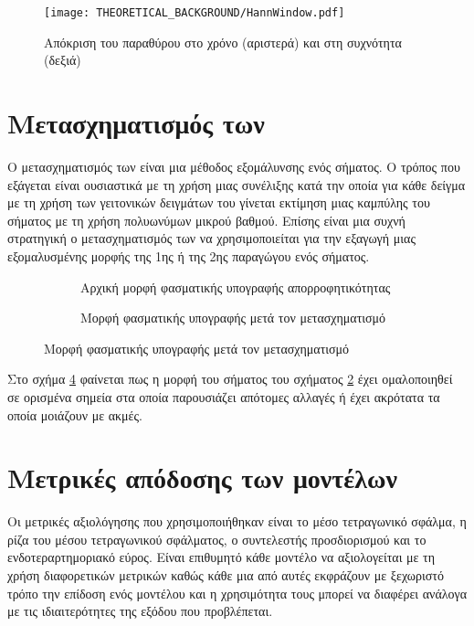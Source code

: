 \begin{figure}[H]
  \begin{center}%
    \texttt{[image: THEORETICAL\_BACKGROUND/HannWindow.pdf]}
    \caption{Απόκριση του παραθύρου  στο χρόνο (αριστερά) και στη συχνότητα (δεξιά)}
    \label{fig:hann-window}
  \end{center}
\end{figure}

\section{Μετασχηματισμός των }
Ο μετασχηματισμός των \cite{savitzky_golay} είναι μια μέθοδος εξομάλυνσης ενός σήματος. Ο τρόπος που εξάγεται είναι ουσιαστικά με τη χρήση μιας συνέλιξης κατά την οποία για κάθε δείγμα με τη χρήση των γειτονικών δειγμάτων του γίνεται εκτίμηση μιας καμπύλης του σήματος με τη χρήση πολυωνύμων μικρού βαθμού. Επίσης είναι μια συχνή στρατηγική ο μετασχηματισμός των  να χρησιμοποιείται για την εξαγωγή μιας εξομαλυσμένης μορφής της 1ης ή της 2ης παραγώγου ενός σήματος.\\

\begin{figure}[H]
    \begin{subfigure}{0.5\textwidth}
        
        \caption{Αρχική μορφή φασματικής υπογραφής απορροφητικότητας}
        \label{fig:abs_initial}
    \end{subfigure}
    \begin{subfigure}{0.5\textwidth}
        
        \caption{Μορφή φασματικής υπογραφής μετά τον μετασχηματισμό }
        \label{fig:abs_sg1}
    \end{subfigure}
\end{figure}

Στο σχήμα \ref{fig:abs_sg1} φαίνεται πως η μορφή του σήματος του σχήματος \ref{fig:abs_initial} έχει ομαλοποιηθεί σε ορισμένα σημεία στα οποία παρουσιάζει απότομες αλλαγές ή έχει ακρότατα τα οποία μοιάζουν με ακμές.

\section{Μετρικές απόδοσης των μοντέλων}
Οι μετρικές αξιολόγησης που χρησιμοποιήθηκαν είναι το μέσο τετραγωνικό σφάλμα, η ρίζα του μέσου τετραγωνικού σφάλματος, ο συντελεστής προσδιορισμού και το ενδοτεραρτημοριακό εύρος. Είναι επιθυμητό κάθε μοντέλο να αξιολογείται με τη χρήση διαφορετικών μετρικών καθώς κάθε μια από αυτές εκφράζουν με ξεχωριστό τρόπο την επίδοση ενός μοντέλου και η χρησιμότητα τους μπορεί να διαφέρει ανάλογα με τις ιδιαιτερότητες της εξόδου που προβλέπεται.

